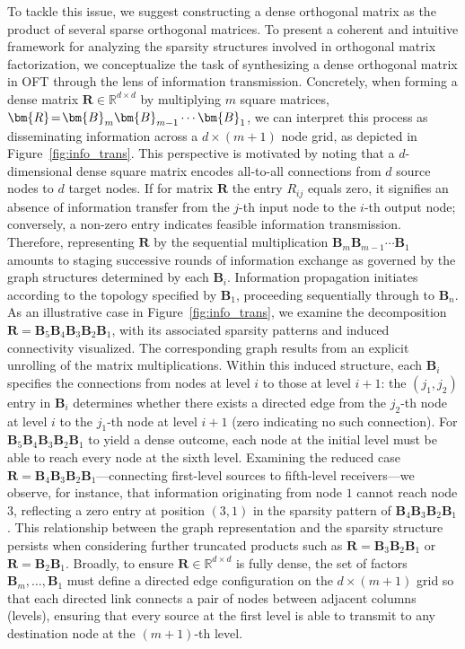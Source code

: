 To tackle this issue, we suggest constructing a dense orthogonal matrix as the product of several sparse orthogonal matrices. To present a coherent and intuitive framework for analyzing the sparsity structures involved in orthogonal matrix factorization, we conceptualize the task of synthesizing a dense orthogonal matrix in OFT through the lens of information transmission. Concretely, when forming a dense matrix $\bm{R}\in\mathbb{R}^{d\times d}$ by multiplying $m$ square matrices, $\thickmuskip=2mu \medmuskip=2mu \bm{R}=\bm{B}_m\bm{B}_{m-1}\cdots\bm{B}_1$, we can interpret this process as disseminating information across a $d\times (m+1)$ node grid, as depicted in Figure~\ref{fig:info_trans}. This perspective is motivated by noting that a $d$-dimensional dense square matrix encodes all-to-all connections from $d$ source nodes to $d$ target nodes. If for matrix $\bm{R}$ the entry $R_{ij}$ equals zero, it signifies an absence of information transfer from the $j$-th input node to the $i$-th output node; conversely, a non-zero entry indicates feasible information transmission. Therefore, representing $\bm{R}$ by the sequential multiplication $\bm{B}_m\bm{B}_{m-1}\cdots\bm{B}_1$ amounts to staging successive rounds of information exchange as governed by the graph structures determined by each $\bm{B}_i$. Information propagation initiates according to the topology specified by $\bm{B}_1$, proceeding sequentially through to $\bm{B}_n$. As an illustrative case in Figure~\ref{fig:info_trans}, we examine the decomposition $\bm{R}=\bm{B}_5\bm{B}_4\bm{B}_3\bm{B}_2\bm{B}_1$, with its associated sparsity patterns and induced connectivity visualized. The corresponding graph results from an explicit unrolling of the matrix multiplications. Within this induced structure, each $\bm{B}_i$ specifies the connections from nodes at level $i$ to those at level $i+1$: the $(j_1,j_2)$ entry in $\bm{B}_i$ determines whether there exists a directed edge from the $j_2$-th node at level $i$ to the $j_1$-th node at level $i+1$ (zero indicating no such connection). For $\bm{B}_5\bm{B}_4\bm{B}_3\bm{B}_2\bm{B}_1$ to yield a dense outcome, each node at the initial level must be able to reach every node at the sixth level. Examining the reduced case $\bm{R}=\bm{B}_4\bm{B}_3\bm{B}_2\bm{B}_1$—connecting first-level sources to fifth-level receivers—we observe, for instance, that information originating from node $1$ cannot reach node $3$, reflecting a zero entry at position $(3,1)$ in the sparsity pattern of $\bm{B}_4\bm{B}_3\bm{B}_2\bm{B}_1$. This relationship between the graph representation and the sparsity structure persists when considering further truncated products such as $\bm{R}=\bm{B}_3\bm{B}_2\bm{B}_1$ or $\bm{R}=\bm{B}_2\bm{B}_1$. Broadly, to ensure $\bm{R}\in\mathbb{R}^{d\times d}$ is fully dense, the set of factors $\bm{B}_m,\ldots,\bm{B}_1$ must define a directed edge configuration on the $d\times (m+1)$ grid so that each directed link connects a pair of nodes between adjacent columns (levels), ensuring that every source at the first level is able to transmit to any destination node at the $(m+1)$-th level.

